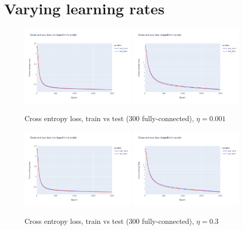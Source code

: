 \documentclass[12pt]{article}
\begin{document}
\section{Varying learning rates}
\label{appendix: varying learning rates}
\begin{figure}[ht]
  \centering
  \includegraphics[width=0.49\textwidth]{images/cross-entropy-comparison-1-300-lr0.001.png}
  \includegraphics[width=0.49\textwidth]{images/cross-entropy-comparison-1-300-lr0.001-log.png}
  \caption{Cross entropy loss, train vs test ($300$ fully-connected), $\eta = 0.001$}
  \label{fig: learning rate comparison 0.001}
\end{figure}
\begin{figure}[ht]
  \centering
  \includegraphics[width=0.49\textwidth]{images/cross-entropy-comparison-1-300-lr0.3.png}
  \includegraphics[width=0.49\textwidth]{images/cross-entropy-comparison-1-300-lr0.3-log.png}
  \caption{Cross entropy loss, train vs test ($300$ fully-connected), $\eta = 0.3$}
  \label{fig: learning rate comparison 0.3}
\end{figure}
\end{document}
